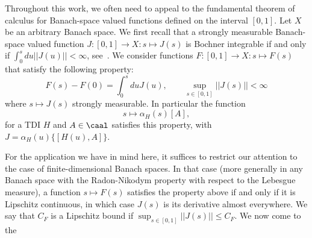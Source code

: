 Throughout this work, we often need to appeal to the fundamental theorem of calculus for Banach-space valued functions defined on the interval $[0,1]$. Let $X$ be an arbitrary Banach space. We first recall that a strongly measurable Banach-space valued function $J: [0,1]\to X: s\mapsto J(s)$ is Bochner integrable if and only if $\int_0^s du ||J(u)||<\infty$, see~\cite{diestel1978vector}. We consider functions $F: [0,1]\to X: s\mapsto F(s)$ that satisfy the following property:
$$
F(s)-F(0)=\int_0^s du J(u), \qquad  \sup_{s\in[0,1]} ||J(s)||  <\infty
$$
where $s\mapsto J(s)$ strongly measurable. In particular the function 
$$s\mapsto \alpha_{H}(s)[A],$$
for a TDI $H$ and $A\in \caal$ satisfies this property, with $J=\alpha_{H}(u)\{[H(u),A]\}$.

For the application we have in mind here, it suffices to restrict our attention to the case of finite-dimensional Banach spaces. In that case (more generally in any Banach space with the Radon-Nikodym property with respect to the Lebesgue measure), a function $s\mapsto F(s)$ satisfies the property above if and only if it is Lipschitz continuous, in which case $J(s)$ is its derivative almost everywhere. We say that $C_F$ is a Lipschitz bound if $ \sup_{s\in[0,1]} ||J(s)|| \leq C_F$.   We now come to the
%
